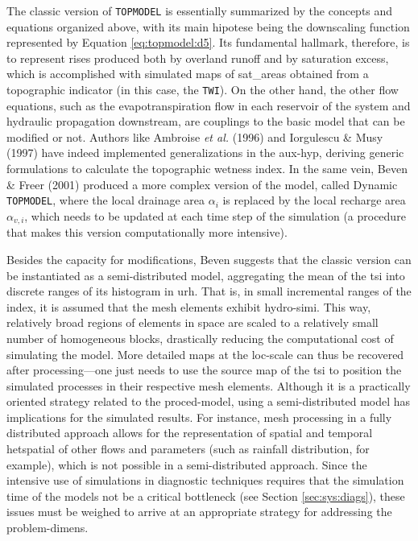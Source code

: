 \documentclass[./main_en.tex]{subfiles}
\begin{document}
\par The classic version of \texttt{TOPMODEL} is essentially summarized by the concepts and equations organized above, with its main \gls{hipotese} being the \gls{downscaling} function represented by Equation \eqref{eq:topmodel:d5}. Its fundamental hallmark, therefore, is to represent rises produced both by overland runoff and by saturation excess, which is accomplished with simulated maps of \gls{sat_areas} obtained from a topographic indicator (in this case, the \texttt{TWI}). On the other hand, the other flow equations, such as the evapotranspiration flow in each reservoir of the \gls{system} and hydraulic propagation downstream, are couplings to the basic \gls{model} that can be modified or not. Authors like Ambroise \textit{et al.} (1996) \cite{Ambroise1996a} and Iorgulescu \& Musy (1997) \cite{Iorgulescu1997a} have indeed implemented generalizations in the \gls{aux-hyp}, deriving generic formulations to calculate the topographic wetness index. In the same vein, Beven \& Freer (2001) \cite{Beven2001b} produced a more complex version of the \gls{model}, called Dynamic \texttt{TOPMODEL}, where the local drainage area $\alpha_i$ is replaced by the local recharge area $\alpha_{v, i}$, which needs to be updated at each time step of the simulation (a procedure that makes this version computationally more intensive).

\par Besides the capacity for modifications, Beven \cite{Beven2012} suggests that the classic version can be instantiated as a semi-distributed \gls{model}, aggregating the mean of the \gls{tsi} into discrete ranges of its histogram in \gls{urh}. That is, in small incremental ranges of the index, it is assumed that the mesh elements exhibit \gls{hydro-simi}. This way, relatively broad regions of elements in space are scaled to a relatively small number of homogeneous blocks, drastically reducing the computational cost of simulating the \gls{model}. More detailed maps at the \gls{loc-scale} can thus be recovered after processing—one just needs to use the source map of the \gls{tsi} to position the simulated processes in their respective mesh elements. Although it is a practically oriented strategy related to the \gls{proced-model}, using a semi-distributed \gls{model} has implications for the simulated results. For instance, mesh processing in a fully distributed approach allows for the representation of spatial and temporal \gls{hetspatial} of other flows and \gls{parameters} (such as rainfall distribution, for example), which is not possible in a semi-distributed approach. Since the intensive use of simulations in diagnostic techniques requires that the simulation time of the models not be a critical bottleneck (see Section \ref{sec:sys:diags}), these issues must be weighed to arrive at an appropriate strategy for addressing the \gls{problem-dimens}.
\end{document}
